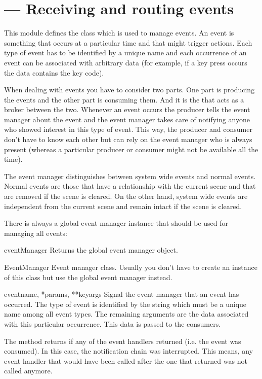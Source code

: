 \section{ ---
         Receiving and routing events}


This module defines the  class which is used to
manage events. An event is something that occurs at a particular time
and that might trigger actions. Each type of event has to be
identified by a unique name and each occurrence of an event can be 
associated with arbitrary data (for example, if a key press occurs the
data contains the key code).

When dealing with events you have to consider two parts. One part is
producing the events and the other part is consuming them. And it is the 
 that acts as a broker between the two. Whenever an
event occurs the producer tells the event manager about the event and
the event manager takes care of notifying anyone who showed interest in
this type of event. This way, the producer and consumer don't have to know
each other but can rely on the event manager who is always present (whereas
a particular producer or consumer might not be available all the time).

The event manager distinguishes between system wide events and normal events.
Normal events are those that have a relationship with the current scene
and that are removed if the scene is cleared. On the other hand, system wide
events are independent from the current scene and remain intact if the
scene is cleared.

There is always a global event manager instance that should be used for
managing all events:

\begin{funcdesc}{eventManager}{}
Returns the global event manager object.
\end{funcdesc}


\begin{classdesc}{EventManager}{}
Event manager class. Usually you don't have to create an instance of
this class but use the global event manager instead.
\end{classdesc}

\begin{methoddesc}{event}{name, *params, **keyargs}
Signal the event manager that an event has occurred. The type of event is
identified by the string  which must be a unique name among all
event types. The remaining arguments are the data associated with this
particular occurrence. This data is passed to the consumers.

The method returns  if any of the event handlers returned
 (i.e. the event was consumed). In this case, the notification
chain was interrupted. This means, any event handler that would have been
called after the one that returned  was not called anymore.
\end{methoddesc}

